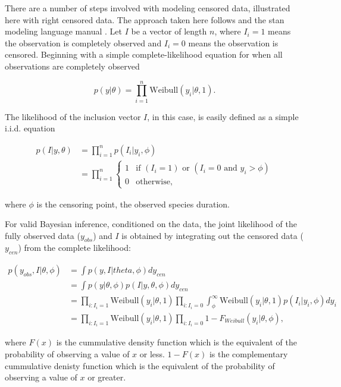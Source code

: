 \documentclass[12pt,letterpaper]{article}
\begin{document}
There are a number of steps involved with modeling censored data, illustrated here with right censored data. The approach taken here follows \citet{Gelman2013d} and the stan modeling language manual \citep{stan-manual:2014}. Let \(I\) be a vector of length \(n\), where \(I_{i} = 1\) means the observation is completely observed and \(I_{i} = 0\) means the observation is censored. Beginning with a simple complete-likelihood equation for when all observations are completely observed

\begin{equation}
  p(y | \theta) = \prod_{i = 1}^{n} \mathrm{Weibull}(y_{i}|\theta, 1).
\end{equation}

The likelihood of the inclusion vector \(I\), in this case, is easily defined as a simple i.i.d. equation

\begin{align*}
  p(I | y, \theta) &= \prod_{i = 1}^{n} p(I_{i} | y_{i}, \phi) \\
  &= \prod_{i = 1}^{n} 
    \begin{cases} 
      1 & \text{if } (I_{i} = 1) \text{ or } (I_{i} = 0 \text{ and } y_{i} > \phi) \\ 
      0 & \text{otherwise},
    \end{cases}
\end{align*}

where \(\phi\) is the censoring point, the observed species duration.

For valid Bayesian inference, conditioned on the data, the joint likelihood of the fully observed data (\(y_{obs}\)) and \(I\) is obtained by integrating out the censored data (\(y_{cen}\)) from the complete likelihood:

\begin{align*}
  p(y_{obs}, I | \theta, \phi) &= \int p(y, I | theta, \phi) dy_{cen} \\
  &= \int p(y | \theta, \phi) p(I | y, \theta, \phi) dy_{cen} \\
  &= \prod_{i: I_{i} = 1} \mathrm{Weibull}(y_{i} | \theta, 1) \prod_{i: I_{i} = 0} \int_{\phi}^{\infty} \mathrm{Weibull}(y_{i} | \theta, 1) p(I_{i} | y_{i}, \phi) dy_{i} \\
  &= \prod_{i: I_{i} = 1} \mathrm{Weibull}(y_{i} | \theta, 1) \prod_{i : I_{i} = 0} 1 - F_{Weibull}(y_{i} | \theta, \phi),
\end{align*}

where \(F(x)\) is the cummulative density function which is the equivalent of the probability of observing a value of \(x\) or less. \(1 - F(x)\) is the complementary cummulative denisty function which is the equivalent of the probability of observing a value of \(x\) or greater.
\end{document}
